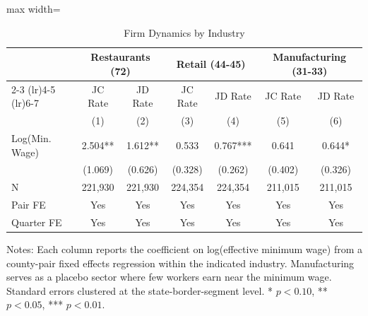 \begin{table}[H]
\centering
\caption{Firm Dynamics by Industry}
\label{tab:industry}
\begin{threeparttable}
\begin{adjustbox}{max width=\textwidth}
\begin{tabular}{lcccccc}
\toprule
 & \multicolumn{2}{c}{Restaurants (72)} & \multicolumn{2}{c}{Retail (44-45)} & \multicolumn{2}{c}{Manufacturing (31-33)} \\
\cmidrule(lr){2-3} \cmidrule(lr){4-5} \cmidrule(lr){6-7}
 & JC Rate & JD Rate & JC Rate & JD Rate & JC Rate & JD Rate \\
 & (1) & (2) & (3) & (4) & (5) & (6) \\
\midrule
Log(Min. Wage) & 2.504** & 1.612** & 0.533 & 0.767*** & 0.641 & 0.644* \\
 & (1.069) & (0.626) & (0.328) & (0.262) & (0.402) & (0.326) \\
\midrule
N & 221,930 & 221,930 & 224,354 & 224,354 & 211,015 & 211,015 \\
Pair FE & Yes & Yes & Yes & Yes & Yes & Yes \\
Quarter FE & Yes & Yes & Yes & Yes & Yes & Yes \\
\bottomrule
\end{tabular}
\end{adjustbox}
\begin{tablenotes}[flushleft]
\small
\item Notes: Each column reports the coefficient on log(effective minimum wage) from a county-pair fixed effects regression within the indicated industry. Manufacturing serves as a placebo sector where few workers earn near the minimum wage. Standard errors clustered at the state-border-segment level. * $p<0.10$, ** $p<0.05$, *** $p<0.01$.
\end{tablenotes}
\end{threeparttable}
\end{table}

